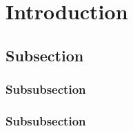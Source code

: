 \documentclass[aps,pra,twocolumn,twoside,superscriptaddress]{revtex4-1}
\begin{document}
\section{Introduction} \label{sec:intro}
\thispagestyle{frontmatter} %
\blindtext
\blindtext
\blindtext\blindtext
\blindtext
\blindtext
\blindtext
\subsection{Subsection} \label{sec:tead}
\blindtext\blindtext
\blindtext
\blindtext
\blindtext\blindtext
\blindtext
\blindtext
\blindtext
\blindtext
\subsubsection{Subsubsection} \label{sec:teww}\blindtext
\blindtext
\blindtext\blindtext
\blindtext
\blindtext\blindtext
\blindtext
\blindtext\blindtext
\blindtext
\blindtext
\subsubsection{Subsubsection} \label{sec:te}\blindtext
\blindtext
\blindtext\blindtext
\blindtext
\blindtext\blindtext
\blindtext
\blindtext\blindtext
\blindtext
\blindtext\blindtext
\blindtext
\blindtext\blindtext
\blindtext
\blindtext
\end{document}
